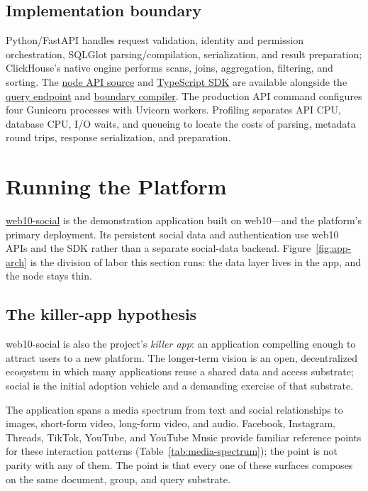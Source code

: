 \documentclass[sigconf, nonacm]{acmart}
\newcommand{\artifactbase}{https://github.com/jacoby149/web10}
\newcommand{\artifactrev}{317fa349eae714ddde07f249ca65cdaa34b6459b}
\newcommand{\artifactdir}[2]{\href{\artifactbase/tree/\artifactrev/#1}{#2}}
\newcommand{\artifactfile}[2]{\href{\artifactbase/blob/\artifactrev/#1}{#2}}
\begin{document}
\subsection{Implementation boundary}

Python/FastAPI handles request validation, identity and permission
orchestration, SQLGlot parsing/compilation, serialization, and result
preparation; ClickHouse's native engine performs scans, joins, aggregation,
filtering, and sorting. The \artifactdir{api/app}{node API source} and
\artifactdir{sdk/src}{TypeScript SDK} are available alongside the
\artifactfile{api/app/v3/endpoints/query.py}{query endpoint} and
\artifactfile{api/app/v3/services/safe_query.py}{boundary compiler}. The
production API command configures four Gunicorn processes with Uvicorn
workers. Profiling separates API CPU, database CPU, I/O waits, and queueing
to locate the costs of parsing, metadata round trips, response
serialization, and preparation.

\section{Running the Platform}
\label{sec:platform}

\artifactdir{marketing/web10-social/src}{web10-social} is the demonstration
application built on web10---and the platform's primary deployment. Its
persistent social data and authentication use web10 APIs and the SDK rather
than a separate social-data backend. Figure~\ref{fig:app-arch} is the
division of labor this section runs: the data layer lives in the app, and
the node stays thin.

\subsection{The killer-app hypothesis}

web10-social is also the project's \emph{killer app}: an application
compelling enough to attract users to a new platform. The longer-term vision
is an open, decentralized ecosystem in which many applications reuse a
shared data and access substrate; social is the initial adoption vehicle and
a demanding exercise of that substrate.

The application spans a media spectrum from text and social relationships to
images, short-form video, long-form video, and audio. Facebook, Instagram,
Threads, TikTok, YouTube, and YouTube Music provide familiar reference points
for these interaction patterns (Table~\ref{tab:media-spectrum}); the point is
not parity with any of them. The point is that every one of these surfaces
composes on the same document, group, and query substrate.
\end{document}
